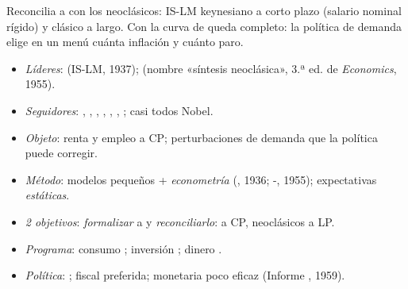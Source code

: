 \documentclass{article}
\begin{document}
\begin{columnas}
\begin{ideaclave}
Reconcilia a  con los neoclásicos: IS-LM keynesiano a corto plazo (salario nominal rígido) y clásico a largo. Con la curva de  queda completo: la política de demanda elige en un menú cuánta inflación y cuánto paro.
\end{ideaclave}

\begin{itemize}
\item \emph{Líderes}:  (IS-LM, 1937);  (nombre «síntesis neoclásica», 3.ª ed. de \emph{Economics}, 1955).
\item \emph{Seguidores}: , , , , , , ; casi todos Nobel.
\item \emph{Objeto}: renta y empleo a CP; perturbaciones de demanda que la política puede corregir.
\item \emph{Método}: modelos pequeños + \emph{econometría} (, 1936; -, 1955); expectativas \emph{estáticas}.
\item \emph{2 objetivos}: \emph{formalizar} a  y \emph{reconciliarlo}:  a CP, neoclásicos a LP.
\item \emph{Programa}: consumo ; inversión ; dinero .
\item \emph{Política}: ; fiscal preferida; monetaria poco eficaz (Informe , 1959).
\end{itemize}


\end{columnas}
\end{document}
